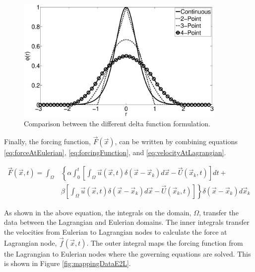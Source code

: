 \documentclass[12pt]{aiaa-pretty}
\begin{document}
%
\begin{figure}
	\centering
	\includegraphics[height=6.0cm]{figure/heaviside_comparison.eps}
	\caption{Comparison between the different delta function formulation.}
	\label{fig:heavisideComparison}
\end{figure}
%

Finally, the forcing function, $\vec{F}(\vec{x})$, can be written by combining equations \eqref{eq:forceAtEulerian}, \eqref{eq:forcingFunction}, and \eqref{eq:velocityAtLagrangian}.

%
\begin{equation}
\begin{aligned}\label{eq:forceAtEulerianFinal}
	\vec{F}(\vec{x}, t) = 
	\int_\Omega 
	&\left\{
 	\alpha \int_0^t
	\left[
	\int_\Omega \vec{u} (\vec{x}, t) \delta(\vec{x} - \vec{x}_k) d\vec{x} - \vec{U}\left( \vec{x}_k, t \right)
	\right]dt + \right. \\
	&\left.
	\beta \left[
	\int_\Omega \vec{u} (\vec{x}, t) \delta(\vec{x} - \vec{x}_k) d\vec{x} - \vec{U}\left( \vec{x}_k, t \right)
	\right]
	\right\} \delta(\vec{x} - \vec{x}_k) d\vec{x}_k
\end{aligned}
\end{equation}
%

As shown in the above equation, the integrals on the domain, $\Omega$, transfer the data between the Lagrangian and Eulerian domains. The inner integrals transfer the velocities from Eulerian to Lagrangian nodes to calculate the force at Lagrangian node, $\vec{f}\left( \vec{x}, t \right)$. The outer integral maps the forcing function from the Lagrangian to Eulerian nodes where the governing equations are solved. This is shown in Figure \ref{fig:mappingDataE2L}.
\end{document}
